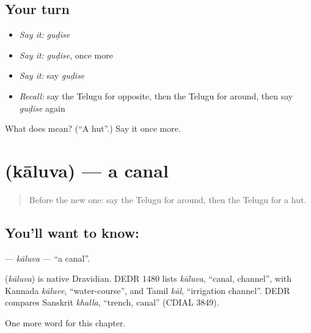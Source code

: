 \subsection*{Your turn}
\begin{itemize}
\raggedright
  \item \emph{Say it:} \emph{guḍise}
  \item \emph{Say it:} \emph{guḍise}, once more
  \item \emph{Say it:} say \emph{guḍise}
  \item \emph{Recall:} say the Telugu for opposite, then the Telugu for around, then say \emph{guḍise} again
\end{itemize}

\begin{tcolorbox}[breakable,colback=teal!4,colframe=teal!35!black,title={Before you move on}]
What does  mean? (\textquotedblleft{}A hut\textquotedblright{}.) Say it once more.
\end{tcolorbox}
\section[\texorpdfstring{\te{కాలువ} (kāluva)}{కాలువ (kāluva)}]{ (kāluva) — a canal}

\label{lesson:TE-C292-kaluva}



\begin{quote}
Before the new one: say the Telugu for around, then the Telugu for a hut.
\end{quote}

\subsection*{You'll want to know: }
\textbf{} — \emph{kāluva} — \textquotedblleft{}a canal\textquotedblright{}.

\begin{cousinweb}
\textbf{} (\emph{kāluva}) is native Dravidian. DEDR 1480 lists \emph{kāluva}, \textquotedblleft{}canal, channel\textquotedblright{}, with Kannada \emph{kāluve}, \textquotedblleft{}water-course\textquotedblright{}, and Tamil \emph{kāl}, \textquotedblleft{}irrigation channel\textquotedblright{}. DEDR compares Sanskrit \emph{khalla}, \textquotedblleft{}trench, canal\textquotedblright{} (CDIAL 3849).
\end{cousinweb}

\begin{grammarlens}[title={What you've built}]
One more word for this chapter.
\end{grammarlens}

